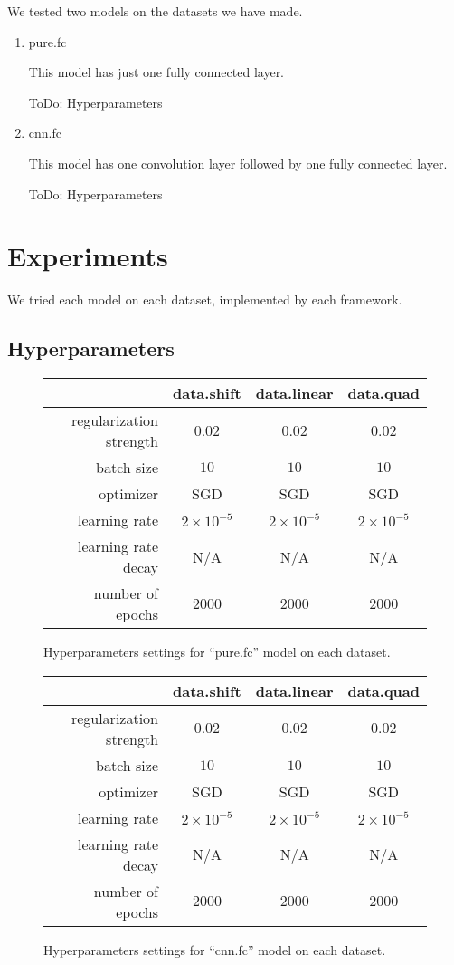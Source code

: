 \documentclass[a4paper]{article}
\begin{document}
We tested two models on the datasets we have made.
\begin{enumerate}
\item pure.fc

	This model has just one fully connected layer.

	ToDo: Hyperparameters

\item cnn.fc

	This model has one convolution layer followed by one fully connected layer.

	ToDo: Hyperparameters
\end{enumerate}

\section{Experiments}

We tried each model on each dataset, implemented by each framework.

\subsection{Hyperparameters}

\begin{figure}[H]
\centering
\begin{tabular}{|r|c|c|c|}
\hline
 & data.shift & data.linear & data.quad \\
\hline
regularization strength & $0.02$ & $0.02$ & $0.02$ \\
\hline
batch size & $10$ & $10$ & $10$ \\
\hline
optimizer & SGD & SGD & SGD \\
\hline
learning rate & $2\times10^{-5}$ & $2\times10^{-5}$ & $2\times10^{-5}$\\
\hline
learning rate decay & N/A & N/A & N/A \\
\hline
number of epochs & $2000$ & $2000$ & $2000$ \\
\hline
\end{tabular}
\caption{Hyperparameters settings for ``pure.fc'' model on each dataset.}
\end{figure}

\begin{figure}[H]
\centering
\begin{tabular}{|r|c|c|c|}
\hline
 & data.shift & data.linear & data.quad \\
\hline
regularization strength & $0.02$ & $0.02$ & $0.02$ \\
\hline
batch size & $10$ & $10$ & $10$ \\
\hline
optimizer & SGD & SGD & SGD \\
\hline
learning rate & $2\times10^{-5}$ & $2\times10^{-5}$ & $2\times10^{-5}$\\
\hline
learning rate decay & N/A & N/A & N/A \\
\hline
number of epochs & $2000$ & $2000$ & $2000$ \\
\hline
\end{tabular}
\caption{Hyperparameters settings for ``cnn.fc'' model on each dataset.}
\end{figure}
\end{document}
